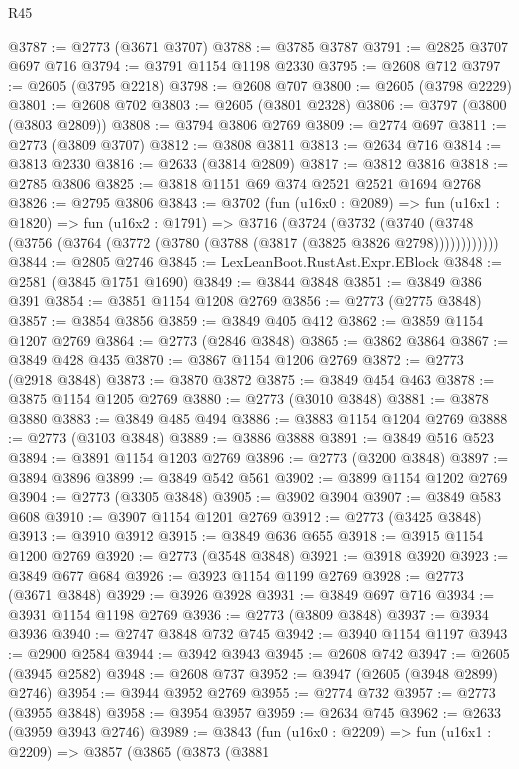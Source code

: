 \begin{lexlean}{R45}
\begin{coremodule}
@3787 := @2773 (@3671 @3707)
@3788 := @3785 @3787
@3791 := @2825 @3707 @697 @716
@3794 := @3791 @1154 @1198 @2330
@3795 := @2608 @712
@3797 := @2605 (@3795 @2218)
@3798 := @2608 @707
@3800 := @2605 (@3798 @2229)
@3801 := @2608 @702
@3803 := @2605 (@3801 @2328)
@3806 := @3797 (@3800 (@3803 @2809))
@3808 := @3794 @3806 @2769
@3809 := @2774 @697
@3811 := @2773 (@3809 @3707)
@3812 := @3808 @3811
@3813 := @2634 @716
@3814 := @3813 @2330
@3816 := @2633 (@3814 @2809)
@3817 := @3812 @3816
@3818 := @2785 @3806
@3825 := @3818 @1151 @69 @374 @2521 @2521 @1694 @2768
@3826 := @2795 @3806
@3843 := @3702
    (fun (u16x0 : @2089) =>
    fun (u16x1 : @1820) =>
    fun (u16x2 : @1791) =>
    @3716
      (@3724
        (@3732
          (@3740 (@3748 (@3756 (@3764 (@3772 (@3780 (@3788 (@3817 (@3825 @3826 @2798))))))))))))
@3844 := @2805 @2746
@3845 := LexLeanBoot.RustAst.Expr.EBlock
@3848 := @2581 (@3845 @1751 @1690)
@3849 := @3844 @3848
@3851 := @3849 @386 @391
@3854 := @3851 @1154 @1208 @2769
@3856 := @2773 (@2775 @3848)
@3857 := @3854 @3856
@3859 := @3849 @405 @412
@3862 := @3859 @1154 @1207 @2769
@3864 := @2773 (@2846 @3848)
@3865 := @3862 @3864
@3867 := @3849 @428 @435
@3870 := @3867 @1154 @1206 @2769
@3872 := @2773 (@2918 @3848)
@3873 := @3870 @3872
@3875 := @3849 @454 @463
@3878 := @3875 @1154 @1205 @2769
@3880 := @2773 (@3010 @3848)
@3881 := @3878 @3880
@3883 := @3849 @485 @494
@3886 := @3883 @1154 @1204 @2769
@3888 := @2773 (@3103 @3848)
@3889 := @3886 @3888
@3891 := @3849 @516 @523
@3894 := @3891 @1154 @1203 @2769
@3896 := @2773 (@3200 @3848)
@3897 := @3894 @3896
@3899 := @3849 @542 @561
@3902 := @3899 @1154 @1202 @2769
@3904 := @2773 (@3305 @3848)
@3905 := @3902 @3904
@3907 := @3849 @583 @608
@3910 := @3907 @1154 @1201 @2769
@3912 := @2773 (@3425 @3848)
@3913 := @3910 @3912
@3915 := @3849 @636 @655
@3918 := @3915 @1154 @1200 @2769
@3920 := @2773 (@3548 @3848)
@3921 := @3918 @3920
@3923 := @3849 @677 @684
@3926 := @3923 @1154 @1199 @2769
@3928 := @2773 (@3671 @3848)
@3929 := @3926 @3928
@3931 := @3849 @697 @716
@3934 := @3931 @1154 @1198 @2769
@3936 := @2773 (@3809 @3848)
@3937 := @3934 @3936
@3940 := @2747 @3848 @732 @745
@3942 := @3940 @1154 @1197
@3943 := @2900 @2584
@3944 := @3942 @3943
@3945 := @2608 @742
@3947 := @2605 (@3945 @2582)
@3948 := @2608 @737
@3952 := @3947 (@2605 (@3948 @2899) @2746)
@3954 := @3944 @3952 @2769
@3955 := @2774 @732
@3957 := @2773 (@3955 @3848)
@3958 := @3954 @3957
@3959 := @2634 @745
@3962 := @2633 (@3959 @3943 @2746)
@3989 := @3843
    (fun (u16x0 : @2209) =>
    fun (u16x1 : @2209) =>
    @3857
      (@3865
        (@3873
          (@3881

\end{coremodule}
\end{lexlean}
